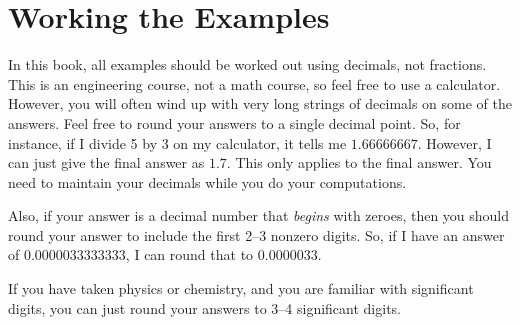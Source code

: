 \section{Working the Examples}

In this book, all examples should be worked out using decimals, not fractions.
This is an engineering course, not a math course, so feel free to use a calculator.
However, you will often wind up with very long strings of decimals on some of the answers.
Feel free to round your answers to a single decimal point.
So, for instance, if I divide 5 by 3 on my calculator, it tells me $1.66666667$.
However, I can just give the final answer as $1.7$.
This only applies to the final answer.  
You need to maintain your decimals while you do your computations.

Also, if your answer is a decimal number that \emph{begins} with zeroes, then you should round your answer to include the first 2--3 nonzero digits.
So, if I have an answer of $0.0000033333333$, I can round that to $0.0000033$.

If you have taken physics or chemistry, and you are familiar with significant digits, you can just round your answers to 3--4 significant digits.
